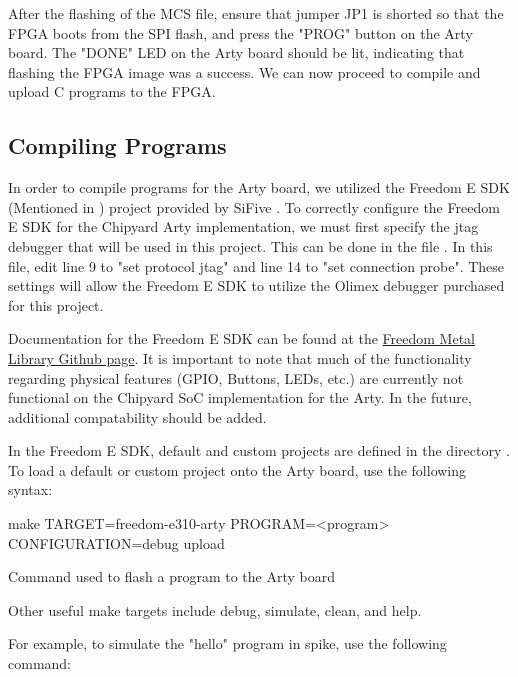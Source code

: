 	After the flashing of the MCS file, ensure that jumper JP1 is shorted so that the FPGA boots from the SPI flash, and press the "PROG" button on the Arty board. 
	The "DONE" LED on the Arty board should be lit, indicating that flashing the FPGA image was a success. 
	We can now proceed to compile and upload C programs to the FPGA.
	
\subsection{Compiling Programs}\label{sec:Compiling_Programs}
	In order to compile programs for the Arty board, we utilized the Freedom E SDK (Mentioned in ) project provided by SiFive \cite{freedomESDK}. 
	To correctly configure the Freedom E SDK for the Chipyard Arty implementation, we must first specify the \Gls{jtag} debugger that will be used in this project. 
	This can be done in the file . 
	In this file, edit line 9 to "set protocol jtag" and line 14 to "set connection probe". 
	These settings will allow the Freedom E SDK to utilize the Olimex debugger purchased for this project. 
	
	Documentation for the Freedom E SDK can be found at the \href{https://sifive.github.io/freedom-metal-docs/}{Freedom Metal Library Github page}.
	It is important to note that much of the functionality regarding physical features (GPIO, Buttons, LEDs, etc.) are currently not functional on the Chipyard SoC implementation for the Arty. In the future, additional compatability should be added.
	
	In the Freedom E SDK, default and custom projects are defined in the directory . To load a default or custom project onto the Arty board, use the following syntax:
	
	

	\begin{listing}[h!tbp]
		\begin{bashsource}
			make TARGET=freedom-e310-arty PROGRAM=<program> CONFIGURATION=debug upload
		\end{bashsource}
		\caption{Command used to flash a program to the Arty board}
		\label{lst:upload_to_arty}
	\end{listing}
	
	Other useful make targets include debug, simulate, clean, and help. 
	
	For example, to simulate the "hello" program in \gls{spike}\cite{SpikeSimulator}, use the following command:

